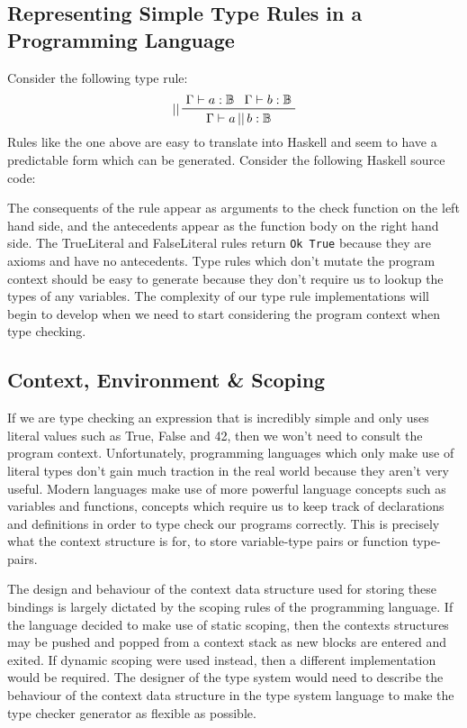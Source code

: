 \documentclass{UoYCSproject}
\begin{document}
\subsection{Representing Simple Type Rules in a Programming Language}
Consider the following type rule:
\begin{displaymath}
    \prftree[l]{||}{\Gamma \vdash a:\mathbb{B}}{\Gamma \vdash b:\mathbb{B}}{
    \Gamma \vdash a \, || \, b:\mathbb{B}}
\end{displaymath}
Rules like the one above are easy to translate into
Haskell and seem to have a predictable form which can be generated. Consider
the following Haskell source code:


The consequents of the rule appear as arguments to the check function on the
left hand side, and the antecedents appear as the function body on the right
hand side. The TrueLiteral and FalseLiteral rules return \lstinline{Ok True}
because they are axioms and have no antecedents. Type rules which don't mutate
the program context should be easy to generate because they don't require us
to lookup the types of any variables. The complexity of our type rule
implementations will begin to develop when we need to start considering the
program context when type checking.

\subsection{Context, Environment \& Scoping}
If we are type checking an expression that is incredibly simple and only uses
literal values such as True, False and 42, then we won't need to consult the
program context. Unfortunately, programming languages which only make use of
literal types don't gain much traction in the real world because they aren't
very useful. Modern languages make use of more powerful language concepts such
as variables and functions, concepts which require us to keep track of
declarations and definitions in order to type check our programs correctly.
This is precisely what the context structure is for, to store variable-type
pairs or function type-pairs.

The design and behaviour of the context data structure used for storing these
bindings is largely dictated by the scoping rules of the programming language.
If the language decided to make use of static scoping, then the contexts
structures may be pushed and popped from a context stack as new blocks are
entered and exited. If dynamic scoping were used instead, then a different
implementation would be required. The designer of the type system would need
to describe the behaviour of the context data structure in the type system
language to make the type checker generator as flexible as possible.
\end{document}
